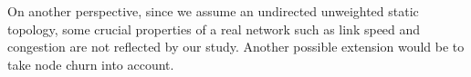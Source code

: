 On another perspective, since we assume an undirected unweighted static topology, some crucial properties of a real network such as link speed and congestion are not reflected by our study. Another possible extension would be to take node churn into account.

